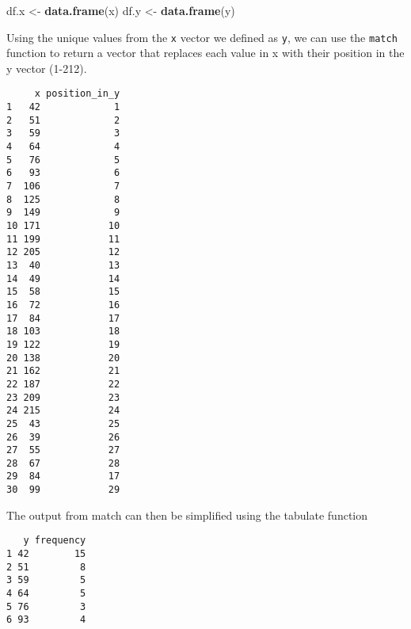\documentclass[12pt,]{article}
\newenvironment{Shaded}{\begin{snugshade}}{\end{snugshade}}
\newcommand{\KeywordTok}[1]{\textcolor[rgb]{0.13,0.29,0.53}{\textbf{#1}}}
\newcommand{\DataTypeTok}[1]{\textcolor[rgb]{0.13,0.29,0.53}{#1}}
\newcommand{\DecValTok}[1]{\textcolor[rgb]{0.00,0.00,0.81}{#1}}
\newcommand{\StringTok}[1]{\textcolor[rgb]{0.31,0.60,0.02}{#1}}
\newcommand{\OperatorTok}[1]{\textcolor[rgb]{0.81,0.36,0.00}{\textbf{#1}}}
\newcommand{\NormalTok}[1]{#1}
\theoremstyle{definition}
\theoremstyle{definition}
\theoremstyle{definition}
\theoremstyle{remark}
\begin{document}
\begin{Shaded}
\begin{Highlighting}[]
\NormalTok{df.x <-}\StringTok{ }\KeywordTok{data.frame}\NormalTok{(x)}
\NormalTok{df.y <-}\StringTok{ }\KeywordTok{data.frame}\NormalTok{(y)}
\end{Highlighting}
\end{Shaded}

Using the unique values from the \texttt{x} vector we defined as
\texttt{y}, we can use the \texttt{match} function to return a vector
that replaces each value in x with their position in the y vector
(1-212).

\begin{Shaded}
\end{Shaded}

\begin{verbatim}
     x position_in_y
1   42             1
2   51             2
3   59             3
4   64             4
5   76             5
6   93             6
7  106             7
8  125             8
9  149             9
10 171            10
11 199            11
12 205            12
13  40            13
14  49            14
15  58            15
16  72            16
17  84            17
18 103            18
19 122            19
20 138            20
21 162            21
22 187            22
23 209            23
24 215            24
25  43            25
26  39            26
27  55            27
28  67            28
29  84            17
30  99            29
\end{verbatim}

The output from match can then be simplified using the tabulate function

\begin{Shaded}
\end{Shaded}

\begin{verbatim}
   y frequency
1 42        15
2 51         8
3 59         5
4 64         5
5 76         3
6 93         4
\end{verbatim}
\end{document}
